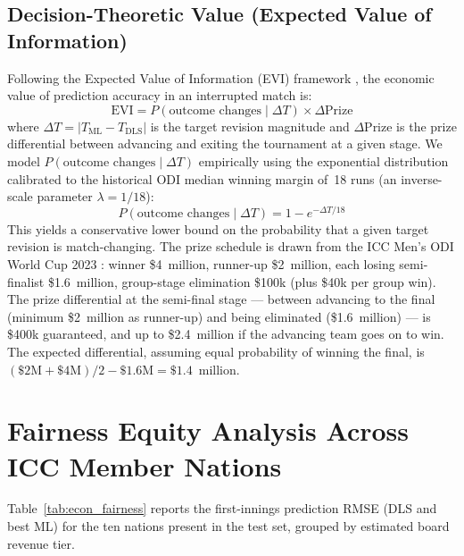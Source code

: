 \documentclass[12pt,a4paper,oneside]{report}
\begin{document}
\subsection{Decision-Theoretic Value (Expected Value of Information)}

Following the Expected Value of Information (EVI) framework \citep{Howard1966}, the economic value of prediction accuracy in an interrupted match is:
\[
\text{EVI} = P(\text{outcome changes} \mid \Delta T) \times \Delta\text{Prize}
\]
where $\Delta T = |T_\text{ML} - T_\text{DLS}|$ is the target revision magnitude and $\Delta\text{Prize}$ is the prize differential between advancing and exiting the tournament at a given stage.  We model $P(\text{outcome changes} \mid \Delta T)$ empirically using the exponential distribution calibrated to the historical ODI median winning margin of~18 runs (an inverse-scale parameter $\lambda = 1/18$):
\[
P(\text{outcome changes} \mid \Delta T) = 1 - e^{-\Delta T / 18}
\]
This yields a conservative lower bound on the probability that a given target revision is match-changing.  The prize schedule is drawn from the ICC Men's ODI World Cup 2023 \citep{ICC2023prizes}: winner \$4~million, runner-up \$2~million, each losing semi-finalist \$1.6~million, group-stage elimination \$100k (plus \$40k per group win).  The prize differential at the semi-final stage --- between advancing to the final (minimum \$2~million as runner-up) and being eliminated (\$1.6~million) --- is \$400k guaranteed, and up to \$2.4~million if the advancing team goes on to win.  The expected differential, assuming equal probability of winning the final, is $(\$2\text{M}+\$4\text{M})/2 - \$1.6\text{M} = \$1.4$~million.

\section{Fairness Equity Analysis Across ICC Member Nations}
\label{sec:econ_fairness}

Table~\ref{tab:econ_fairness} reports the first-innings prediction RMSE (DLS and best ML) for the ten nations present in the test set, grouped by estimated board revenue tier.
\end{document}
